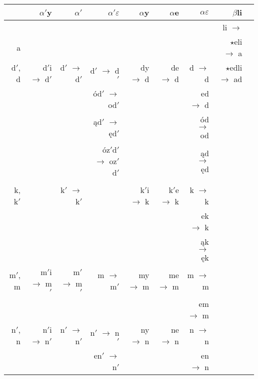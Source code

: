 \documentclass{article}
\begin{document}
\begin{table}
\vspace*{-1cm}
\hspace*{-2cm}
  \centering
  \begin{tabular}{r|rrrrrrrr}
& \boldmath$\alpha'${\bf y} & \boldmath$\alpha'$ & \boldmath$\alpha'\varepsilon$ & \boldmath$\alpha${\bf y} & \boldmath$\alpha${\bf e} & \boldmath$\alpha\varepsilon$ & \boldmath$\beta${\bf li} \\
\hline
& & & & & & & li $\rightarrow$ \\
\hline
a & & & & & & & $\star$eli $\rightarrow$ a \\
\hline
d$'$, d & d$'$i $\rightarrow$ d$'$ & d$'$ $\rightarrow$ d$'$ & d$'$ $\rightarrow$ d$'$ & dy $\rightarrow$ d & de $\rightarrow$ d & d $\rightarrow$ d & $\star$edli $\rightarrow$ ad  \\

& & & ód$'$ $\rightarrow$ od$'$ & & & ed $\rightarrow$ d & \\

& & & ąd$'$ $\rightarrow$ ęd$'$ & & & ód $\rightarrow$ od & \\

& & & óz$'$d$'$ $\rightarrow$ oz$'$d$'$ & & & ąd $\rightarrow$ ęd & \\

& & & & & & & \\
\hline

k, k$'$ & & k$'$ $\rightarrow$ k$'$ & & k$'$i $\rightarrow$ k & k$'$e $\rightarrow$ k & k $\rightarrow$ k & \\

& & & & & & ek $\rightarrow$ k & \\

& & & & & & ąk $\rightarrow$ ęk & \\
\hline

m$'$, m & m$'$i $\rightarrow$ m$'$ & m$'$ $\rightarrow$ m$'$ & m $\rightarrow$ m$'$ & my $\rightarrow$ m & me $\rightarrow$ m & m $\rightarrow$ m & \\

& & & & & & em $\rightarrow$ m & \\
\hline

n$'$, n & n$'$i $\rightarrow$ n$'$ & n$'$ $\rightarrow$ n$'$ & n$'$ $\rightarrow$ n$'$ & ny $\rightarrow$ n & ne $\rightarrow$ n & n $\rightarrow$ n & \\

& & & en$'$ $\rightarrow$ n$'$ & & & en $\rightarrow$ n & \\


\end{tabular}
\end{table}
\end{document}
